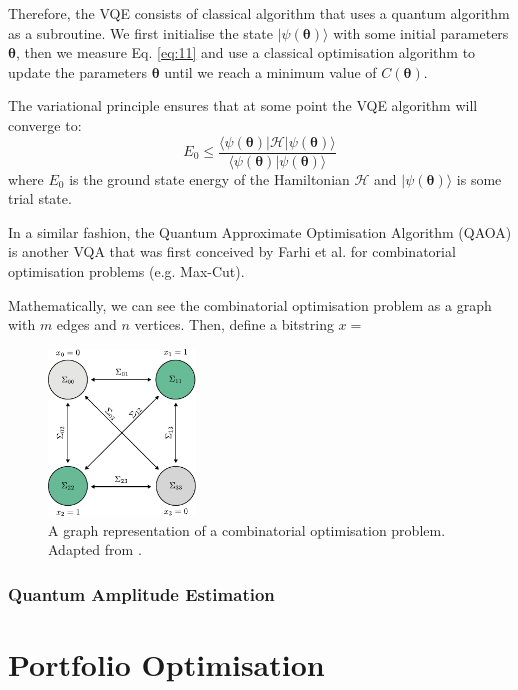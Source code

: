 \documentclass[prx,twocolumn,floatfix,superscriptaddress,longbibliography]{revtex4-1}
\begin{document}
Therefore, the VQE consists of classical algorithm that uses a quantum algorithm as a subroutine. We first initialise the state 
$|\psi(\boldsymbol{\theta})\rangle$ with some initial parameters $\boldsymbol{\theta}$, then we measure Eq. \ref{eq:11} and use a classical optimisation algorithm to update 
the parameters $\boldsymbol{\theta}$ until we reach a minimum value of $C(\boldsymbol{\theta})$.

The variational principle ensures that at some point the VQE algorithm will converge to:
\begin{equation}
  \label{eq:13}
  E_0 \leq \frac{\langle \psi(\boldsymbol{\theta})|\mathcal{H}|\psi(\boldsymbol{\theta})\rangle}{\langle \psi(\boldsymbol{\theta})|\psi(\boldsymbol{\theta})\rangle}
\end{equation}
where $E_0$ is the ground state energy of the Hamiltonian $\mathcal{H}$ and $|\psi(\boldsymbol{\theta})\rangle$ is some trial state.

In a similar fashion, the Quantum Approximate Optimisation Algorithm (QAOA) is another VQA that was first 
conceived by Farhi et al. \cite{Farhi2014} for combinatorial optimisation problems (e.g. Max-Cut).

Mathematically, we can see the combinatorial optimisation problem as a graph with $m$ edges and $n$ vertices. Then, define a bitstring $x = $ 

\begin{figure}[h!]
\centering 
\includegraphics[width=0.35\textwidth]{combinatorial-problem.pdf}
  \caption{\label{fig:combinatorial} A graph representation of a combinatorial optimisation problem. Adapted from \cite{Baker2022}.} 
\end{figure}

\subsubsection{Quantum Amplitude Estimation}


\section{Portfolio Optimisation}\label{sec:literature1}
\end{document}
